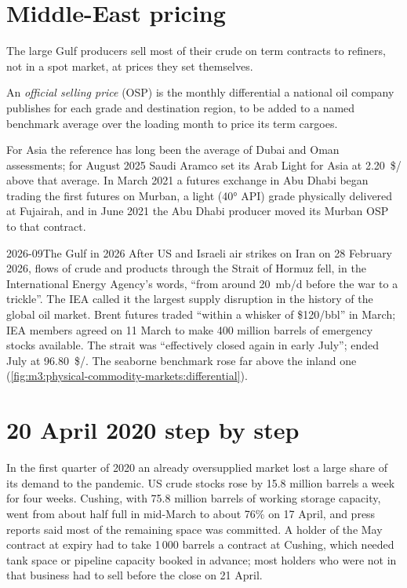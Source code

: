 \section{Middle-East pricing}

The large Gulf producers sell most of their crude on term contracts to refiners,
not in a spot market, at prices they set themselves.

\begin{definition}\label{def:m3:crude-oil:osp}
An \emph{official selling price} (OSP) is the monthly
differential a national oil company publishes for each grade and destination
region, to be added to a named benchmark average over the loading month to price
its term cargoes.
\end{definition}

For Asia the reference has long been the average of Dubai and Oman assessments;
for August 2025 Saudi Aramco set its Arab Light for Asia at \qty{2.20}{\$/\barrel}
above that average. In March 2021 a futures exchange in Abu Dhabi began trading
the first futures on Murban, a light (40° API) grade physically delivered at
Fujairah, and in June 2021 the Abu Dhabi producer moved its Murban OSP to that
contract.

\begin{dated}{2026-09}{The Gulf in 2026}\label{dat:m3:crude-oil:hormuz}
After US and Israeli air strikes on Iran on 28 February 2026, flows of crude and
products through the Strait of Hormuz fell, in the International Energy Agency's
words, ``from around 20~mb/d before the war to a trickle''. The IEA called it the
largest supply disruption in the history of the global oil market. Brent futures
traded ``within a whisker of \$120/bbl'' in March; IEA members agreed on 11 March to
make 400 million barrels of emergency stocks available. The strait was
``effectively closed again in early July'';  ended July at
\qty{96.80}{\$/\barrel}. The seaborne benchmark rose far above the inland one
(\cref{fig:m3:physical-commodity-markets:differential}).
\end{dated}

\section{20 April 2020 step by step}

In the first quarter of 2020 an already oversupplied market lost a large share of
its demand to the pandemic. US crude stocks rose by 15.8 million barrels a week for
four weeks. Cushing, with 75.8 million barrels of working storage capacity, went
from about half full in mid-March to about 76\% on 17 April, and press reports said
most of the remaining space was committed. A holder of the May contract at expiry
had to take 1\,000 barrels a contract at Cushing, which needed tank space or pipeline
capacity booked in advance; most holders who were not in that business had to sell
before the close on 21 April.

